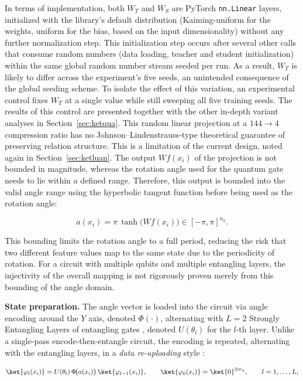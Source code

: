 In terms of implementation, both $W_T$ and $W_S$ are PyTorch
\texttt{nn.Linear} layers, initialized with the library's default
distribution (Kaiming-uniform for the weights, uniform for the bias,
based on the input dimensionality) without any further normalization
step. This initialization step occurs after several other calls that
consume random numbers (data loading, teacher and student
initialization) within the same global random number stream seeded
per run. As a result, $W_T$ is likely to differ across the
experiment's five seeds, an unintended consequence of the global
seeding scheme. To isolate the effect of this variation, an
experimental control fixes $W_T$ at a single value while still
sweeping all five training seeds. The results of this control are
presented together with the other in-depth variant analyses in
Section~\ref{sec:ketqua}. This random linear projection at a
$144 \to 4$ compression ratio has no Johnson--Lindenstrauss-type
theoretical guarantee of preserving relation structure. This is a
limitation of the current design, noted again in
Section~\ref{sec:ketluan}. The output $Wf(x_i)$ of the projection is
not bounded in magnitude, whereas the rotation angle used for the
quantum gate needs to lie within a defined range. Therefore, this
output is bounded into the valid angle range using the hyperbolic
tangent function before being used as the rotation angle:

\begin{equation}
\label{eq:angles}
a(x_i) = \pi \, \tanh\!\big( W f(x_i) \big) \in [-\pi, \pi]^{n_q}.
\end{equation}

This bounding limits the rotation angle to a full period, reducing
the risk that two different feature values map to the same state due
to the periodicity of rotation. For a circuit with multiple qubits
and multiple entangling layers, the injectivity of the overall
mapping is not rigorously proven merely from this bounding of the
angle domain.

\textbf{State preparation.} The angle vector is loaded into the
circuit via angle encoding around the $Y$ axis, denoted $\Phi(\cdot)$,
alternating with $L = 2$ Strongly Entangling Layers of entangling
gates \cite{schuld2020circuitcentric}, denoted $U(\theta_l)$ for the
$l$-th layer. Unlike a single-pass encode-then-entangle circuit, the
encoding is repeated, alternating with the entangling layers, in a
\emph{data re-uploading} style \cite{perezsalinas2020data}:

\begin{equation}
\label{eq:layer}
\ket{\varphi_l(x_i)} = U(\theta_l)\,\Phi\!\big(a(x_i)\big)\,\ket{\varphi_{l-1}(x_i)},
\qquad
\ket{\varphi_0(x_i)} = \ket{0}^{\otimes n_q},
\qquad l = 1,\ldots,L,
\end{equation}

